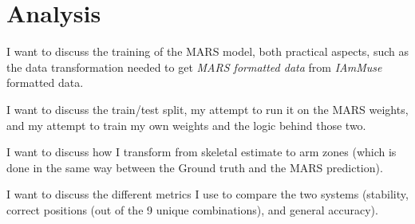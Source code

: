 \section{Analysis}
\label{section: experiments - analysis}
I want to discuss the training of the MARS model, both practical aspects, such as the data transformation needed to get \textit{MARS formatted data} from \textit{IAmMuse} formatted data.

I want to discuss the train/test split, my attempt to run it on the MARS weights, and my attempt to train my own weights and the logic behind those two.

I want to discuss how I transform from skeletal estimate to arm zones (which is done in the same way between the Ground truth and the MARS prediction).

I want to discuss the different metrics I use to compare the two systems (stability, correct positions (out of the 9 unique combinations), and general accuracy).


